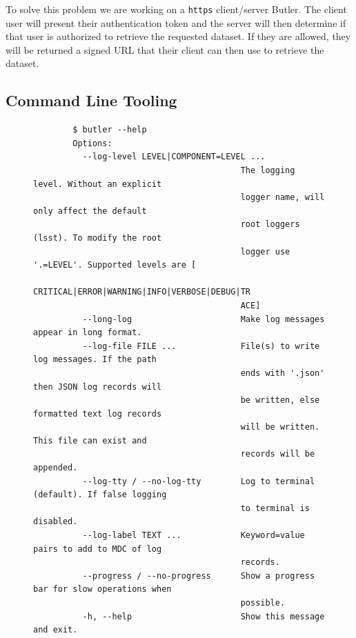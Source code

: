 \documentclass[]{spie}
\begin{document}
To solve this problem we are working on a \texttt{https} client/server Butler\cite{DMTN-176}.
The client user will present their authentication token and the server will then determine if that user is authorized to retrieve the requested dataset.
If they are allowed, they will be returned a signed URL that their client can then use to retrieve the dataset.

\subsection{Command Line Tooling}

\begin{figure}
    \begin{small}
    \begin{verbatim}
        $ butler --help
        Options:
          --log-level LEVEL|COMPONENT=LEVEL ...
                                          The logging level. Without an explicit
                                          logger name, will only affect the default
                                          root loggers (lsst). To modify the root
                                          logger use '.=LEVEL'. Supported levels are [
                                          CRITICAL|ERROR|WARNING|INFO|VERBOSE|DEBUG|TR
                                          ACE]
          --long-log                      Make log messages appear in long format.
          --log-file FILE ...             File(s) to write log messages. If the path
                                          ends with '.json' then JSON log records will
                                          be written, else formatted text log records
                                          will be written. This file can exist and
                                          records will be appended.
          --log-tty / --no-log-tty        Log to terminal (default). If false logging
                                          to terminal is disabled.
          --log-label TEXT ...            Keyword=value pairs to add to MDC of log
                                          records.
          --progress / --no-progress      Show a progress bar for slow operations when
                                          possible.
          -h, --help                      Show this message and exit.


\end{verbatim}
\end{small}
\end{figure}
\end{document}
